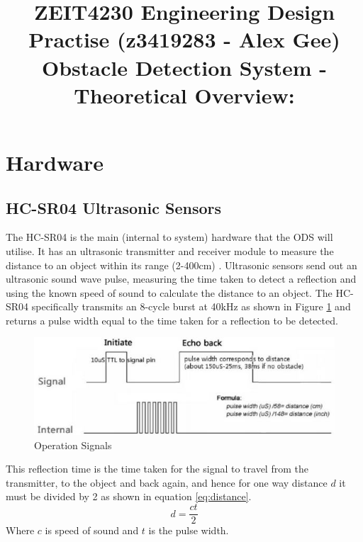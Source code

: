 \documentclass[11pt]{article}
\begin{document}
		
		\title{\vspace{-2.5cm}ZEIT4230 Engineering Design Practise (z3419283 - Alex Gee)\\
			Obstacle Detection System - Theoretical Overview:}
		\date{}
		\author{}
		\maketitle
		\vspace{-1.5cm}
			
		\section{Hardware}
			\subsection{HC-SR04 Ultrasonic Sensors}
					The HC-SR04 is the main (internal to system) hardware that the ODS will utilise. It has an ultrasonic transmitter and receiver module to measure the distance to an object within its range (2-400cm) \cite{hcsr04Manual}. Ultrasonic sensors send out an ultrasonic sound wave pulse, measuring the time taken to detect a reflection and using the known speed of sound to calculate the distance to an object. The HC-SR04 specifically transmits an 8-cycle burst at 40kHz as shown in Figure \ref{fig:hcsr04Pulses} and returns a pulse width equal to the time taken for a reflection to be detected. 
					
					\begin{figure}[H]
						\centering
						\includegraphics[width=0.6\linewidth]{Images/hcsr04Pulses.jpg}
						\caption{Operation Signals \cite{hcsr04Manual}}
						\label{fig:hcsr04Pulses}
					\end{figure}
										
					This reflection time is the time taken for the signal to travel from the transmitter, to the object and back again, and hence for one way distance $d$ it must be divided by 2 as shown in equation \ref{eq:distance}.
					\begin{equation}\label{eq:distance}
						d = \frac{ct}{2}
					\end{equation}
					Where $c$ is speed of sound and $t$ is the pulse width.
					
\end{document}
